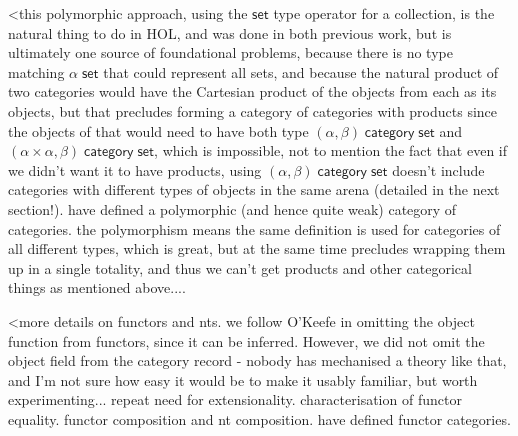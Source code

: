 \documentclass[twoside,titlepage,11pt]{article}
\begin{document}
<this polymorphic approach, using the $\mathsf{set}$ type operator for a collection, is the natural thing to do in HOL, and was done in both previous work, but is ultimately one source of foundational problems, because there is no type matching $\alpha\;\mathsf{set}$ that could represent all sets, and because the natural product of two categories would have the Cartesian product of the objects from each as its objects, but that precludes forming a category of categories with products since the objects of that would need to have both type $(\alpha,\beta)\;\mathsf{category}\;\mathsf{set}$ and $(\alpha\times\alpha,\beta)\;\mathsf{category}\;\mathsf{set}$, which is impossible, not to mention the fact that even if we didn't want it to have products, using $(\alpha,\beta)\;\mathsf{category}\;\mathsf{set}$ doesn't include categories with different types of objects in the same arena (detailed in the next section!). 
have defined a polymorphic (and hence quite weak) category of categories. the polymorphism means the same definition is used for categories of all different types, which is great, but at the same time precludes wrapping them up in a single totality, and thus we can't get products and other categorical things as mentioned above....

<more details on functors and nts. we follow O'Keefe in omitting the object function from functors, since it can be inferred. However, we did not omit the object field from the category record - nobody has mechanised a theory like that, and I'm not sure how easy it would be to make it usably familiar, but worth experimenting...
repeat need for extensionality. characterisation of functor equality. functor composition and nt composition. have defined functor categories.
\end{document}
